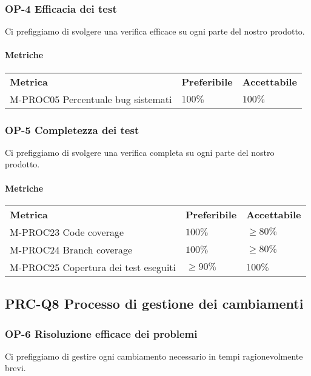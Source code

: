 		\subsubsection{OP-4 Efficacia dei test}
			Ci prefiggiamo di svolgere una verifica efficace su ogni parte del nostro prodotto\glo.
			\paragraph{Metriche} \mbox{}
			\begin{longtable} {
					>{}p{80mm} 
					>{}p{25mm}
					>{}p{25mm}
				}
				\rowcolor{gray!50}
				\textbf{Metrica} & \textbf{Preferibile} & \textbf{Accettabile} \TBstrut \TBstrut \\
				M-PROC05 Percentuale bug sistemati & $100\%$ & $100\%$ \TBstrut \\ [2mm]
			\end{longtable}
			\subsubsection{OP-5 Completezza dei test}
			Ci prefiggiamo di svolgere una verifica completa su ogni parte del nostro prodotto\glo.
			\paragraph{Metriche} \mbox{}
			\begin{longtable} {
					>{}p{80mm} 
					>{}p{25mm}
					>{}p{25mm}
				}
				\rowcolor{gray!50}
				\textbf{Metrica} & \textbf{Preferibile} & \textbf{Accettabile} \TBstrut \TBstrut \\
				M-PROC23 Code coverage & $100\%$ & $\ge 80\%$ \TBstrut \\ [2mm]
				M-PROC24 Branch coverage & $100\%$ & $\ge 80\%$ \TBstrut \\ [2mm]
				M-PROC25 Copertura dei test eseguiti & $\ge 90\%$ & $100\%$ \TBstrut \\ [2mm]
			\end{longtable}	
			
	\subsection{PRC-Q8 Processo di gestione dei cambiamenti}
		\subsubsection{OP-6 Risoluzione efficace dei problemi}
			Ci prefiggiamo di gestire ogni cambiamento necessario in tempi ragionevolmente brevi.
